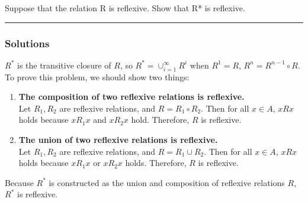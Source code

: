 \newpage
\begin{question}
Suppose that the relation R is reflexive. Show that R* is
reflexive.
\end{question}

\par\noindent\rule{\textwidth}{0.5pt}

\subsubsection*{Solutions}

$R^*$ is the transitive closure of $R$, so $R^* = \cup _{i = 1} ^{\infty} R^i$ when $R^1 = R$, $R^n = R^{n-1} \circ R$. To prove this problem, we should show two things:
\begin{enumerate}
    \item \textbf{The composition of two reflexive relations is reflexive.}\\
    Let $R_1, R_2$ are reflexive relations, and $R = R_1 \circ R_2$. Then for all $x \in A$, $xRx$ holds because $xR_1x$ and $xR_2x$ hold. Therefore, $R$ is reflexive.
    \item \textbf{The union of two reflexive relations is reflexive.}\\
    Let $R_1, R_2$ are reflexive relations, and $R = R_1 \cup R_2$. Then for all $x \in A$, $xRx$ holds because $xR_1x$ or $xR_2x$ holds. Therefore, $R$ is reflexive.
\end{enumerate}
Because $R^*$ is constructed as the union and composition of reflexive relations $R$, $R^*$ is reflexive.